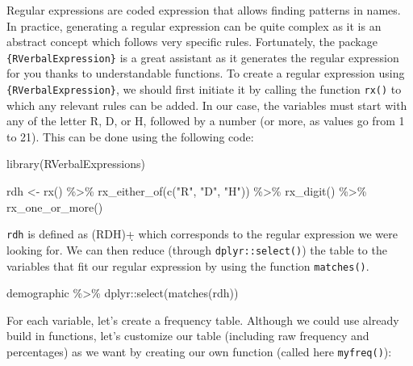 \documentclass[
]{krantz}
\makeatletter
\newenvironment{Shaded}{\begin{snugshade}}{\end{snugshade}}
\newcommand{\FunctionTok}[1]{\textcolor[rgb]{0,0,0}{#1}}
\newcommand{\NormalTok}[1]{#1}
\newcommand{\OtherTok}[1]{\textcolor[rgb]{0.37,0.37,0.37}{#1}}
\newcommand{\SpecialCharTok}[1]{\textcolor[rgb]{0,0,0}{#1}}
\newcommand{\StringTok}[1]{\textcolor[rgb]{0.5,0.5,0.5}{#1}}
\newenvironment{kframe}{%
\medskip{}
\setlength{\fboxsep}{.8em}
 \def\at@end@of@kframe{}%
 \ifinner\ifhmode%
  \def\at@end@of@kframe{\end{minipage}}%
  \begin{minipage}{\columnwidth}%
 \fi\fi%
 \def\FrameCommand##1{\hskip\@totalleftmargin \hskip-\fboxsep
 \colorbox{shadecolor}{##1}\hskip-\fboxsep
     \hskip-\linewidth \hskip-\@totalleftmargin \hskip\columnwidth}%
 \MakeFramed {\advance\hsize-\width
   \@totalleftmargin\z@ \linewidth\hsize
   \@setminipage}}%
 {\par\unskip\endMakeFramed%
 \at@end@of@kframe}
\renewenvironment{Shaded}{\begin{kframe}}{\end{kframe}}
\makeatother
\begin{document}
Regular expressions are coded expression that allows finding patterns in names. In practice, generating a regular expression can be quite complex as it is an abstract concept which follows very specific rules. Fortunately, the package \texttt{\{RVerbalExpression\}} is a great assistant as it generates the regular expression for you thanks to understandable functions.
To create a regular expression using \texttt{\{RVerbalExpression\}}, we should first initiate it by calling the function \texttt{rx()} to which any relevant rules can be added. In our case, the variables must start with any of the letter R, D, or H, followed by a number (or more, as values go from 1 to 21). This can be done using the following code:

\begin{Shaded}
\begin{Highlighting}[]
\FunctionTok{library}\NormalTok{(RVerbalExpressions)}

\NormalTok{rdh }\OtherTok{\textless{}{-}} \FunctionTok{rx}\NormalTok{() }\SpecialCharTok{\%\textgreater{}\%}
  \FunctionTok{rx\_either\_of}\NormalTok{(}\FunctionTok{c}\NormalTok{(}\StringTok{"R"}\NormalTok{, }\StringTok{"D"}\NormalTok{, }\StringTok{"H"}\NormalTok{)) }\SpecialCharTok{\%\textgreater{}\%}
  \FunctionTok{rx\_digit}\NormalTok{() }\SpecialCharTok{\%\textgreater{}\%}
  \FunctionTok{rx\_one\_or\_more}\NormalTok{()}
\end{Highlighting}
\end{Shaded}

\texttt{rdh} is defined as (R\textbar D\textbar H)\d+ which corresponds to the regular expression we were looking for. We can then reduce (through \texttt{dplyr::select()}) the table to the variables that fit our regular expression by using the function \texttt{matches()}.

\begin{Shaded}
\begin{Highlighting}[]
\NormalTok{demographic }\SpecialCharTok{\%\textgreater{}\%}
\NormalTok{  dplyr}\SpecialCharTok{::}\FunctionTok{select}\NormalTok{(}\FunctionTok{matches}\NormalTok{(rdh))}
\end{Highlighting}
\end{Shaded}

For each variable, let's create a frequency table. Although we could use already build in functions, let's customize our table (including raw frequency and percentages) as we want by creating our own function (called here \texttt{myfreq()}):
\end{document}

